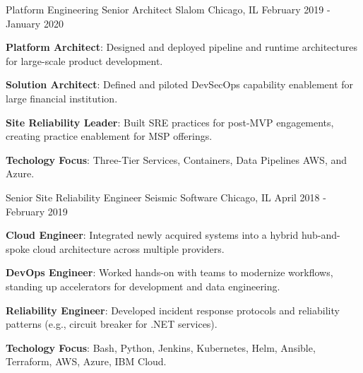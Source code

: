 \begin{cventries}
  \cventry
    {Platform Engineering Senior Architect} %
    {Slalom} %
    {Chicago, IL} %
    {February 2019 - January 2020} %
    {
      \begin{cvitems} %
        \item {\textbf{Platform Architect}: Designed and deployed pipeline and runtime architectures for large-scale product development.}
        \item {\textbf{Solution Architect}: Defined and piloted DevSecOps capability enablement for large financial institution.}
        \item {\textbf{Site Reliability Leader}: Built SRE practices for post-MVP engagements, creating practice enablement for MSP offerings.}
        \item {\textbf{Techology Focus}: Three-Tier Services, Containers, Data Pipelines AWS, and Azure.}
      \end{cvitems}
    }

  \cventry
    {Senior Site Reliability Engineer} %
    {Seismic Software} %
    {Chicago, IL} %
    {April 2018 - February 2019} %
    {
      \begin{cvitems} %
        \item {\textbf{Cloud Engineer}: Integrated newly acquired systems into a hybrid hub-and-spoke cloud architecture across multiple providers.}
        \item {\textbf{DevOps Engineer}: Worked hands-on with teams to modernize workflows, standing up accelerators for development and data engineering.}
        \item {\textbf{Reliability Engineer}: Developed incident response protocols and reliability patterns (e.g., circuit breaker for .NET services).}
        \item {\textbf{Techology Focus}: Bash, Python, Jenkins, Kubernetes, Helm, Ansible, Terraform, AWS, Azure, IBM Cloud.}
      \end{cvitems}
    }


\end{cventries}
